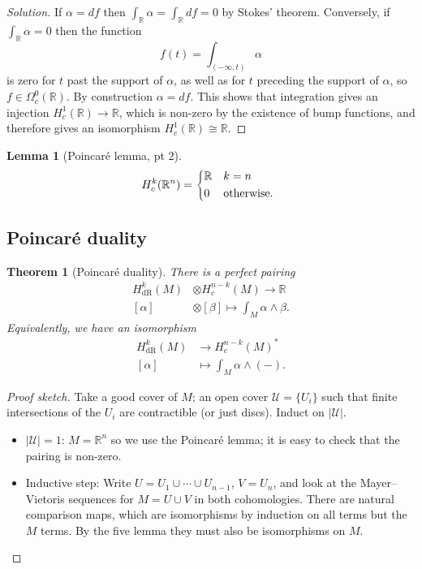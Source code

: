 \documentclass{article}
\newtheorem*{theorem}{Theorem}
\newtheorem*{lemma}{Lemma}
\theoremstyle{definition}
\newcommand{\dR}{\mathrm{dR}}
\newcommand{\U}{\mathcal{U}}
\newcommand{\R}{\mathbb{R}}
\begin{document}
\begin{proof}[Solution]
    If $\alpha=df$ then $\int_\R\alpha=\int_\R df=0$ by Stokes' theorem.
    Conversely, if $\int_\R\alpha=0$ then the function
    \begin{equation*}
        f(t)=\int_{(-\infty,t)}\alpha
    \end{equation*}
    is zero for $t$ past the support of $\alpha$, as well as for $t$ preceding
    the support of $\alpha$, so $f\in\Omega^0_c(\R)$. By construction
    $\alpha=df$. This shows that integration gives an injection
    $H^1_c(\R)\to\R$, which is non-zero by the existence of bump functions, and
    therefore gives an isomorphism $H^1_c(\R)\cong\R$.
\end{proof}

\begin{lemma}[Poincar\'e lemma, pt 2]
    \begin{equation*}
        H^k_c(\R^n) = \begin{dcases*}
            \R & $k=n$ \\
            0 & otherwise.
        \end{dcases*}
    \end{equation*}
\end{lemma}

\subsection*{Poincar\'e duality}

\begin{theorem}[Poincar\'e duality]
    There is a perfect pairing
    \begin{align*}
        H^k_\dR(M)&\otimes H^{n-k}_c(M) \to \R \\
        [\alpha]&\otimes[\beta] \mapsto \int_M\alpha\wedge\beta.
    \end{align*}
    Equivalently, we have an isomorphism
    \begin{align*}
        H^k_\dR(M) &\to H^{n-k}_c(M)^* \\
        [\alpha] &\mapsto \int_M\alpha\wedge(-).
    \end{align*}
\end{theorem}

\begin{proof}[Proof sketch]
    Take a good cover of $M$; an open cover $\U=\{U_i\}$ such that
    finite intersections of the $U_i$ are contractible (or just discs). Induct
    on $|\U|$.
    \begin{itemize}
        \item $|\U|=1$: $M=\R^n$ so we use the Poincar\'e lemma; it is easy to
            check that the pairing is non-zero.

        \item Inductive step: Write $U=U_1\cup\cdots\cup U_{n-1}$, $V=U_n$, and
            look at the Mayer--Vietoris sequences for $M=U\cup V$ in both
            cohomologies. There are natural comparison maps, which are
            isomorphisms by induction on all terms but the $M$ terms. By the
            five lemma they must also be isomorphisms on $M$.
    \end{itemize}
\end{proof}
\end{document}
